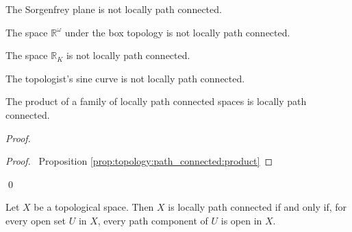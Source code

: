 \begin{cor}
The Sorgenfrey plane is not locally path connected.
\end{cor}

\begin{cor}
 The space $\mathbb{R}^\omega$ under the box topology is not locally path
connected.
\end{cor}

\begin{cor}
 The space $\mathbb{R}_K$ is not locally path connected.
\end{cor}

\begin{cor}
The topologist's sine curve is not locally path connected.
\end{cor}

\begin{prop}[AC]
The product of a family of locally path connected spaces is locally path connected.
\end{prop}

\begin{proof}
\pf
{}
\begin{proof}
  \pf\ Proposition \ref{prop:topology:path_connected:product}
\end{proof}
\qed
\end{proof}

\begin{prop}
  \label{prop:topology:locally_path_connected:open}
  Let $X$ be a topological space. Then $X$ is locally path connected if and
  only
  if, for every open set $U$ in $X$, every path component of $U$ is open in
  $X$.
\end{prop}

